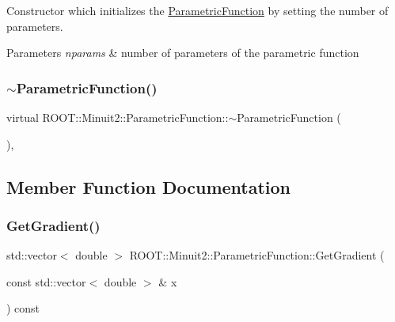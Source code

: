 Constructor which initializes the \mbox{\hyperlink{classROOT_1_1Minuit2_1_1ParametricFunction}{Parametric\+Function}} by setting the number of parameters.


\begin{DoxyParams}{Parameters}
{\em nparams} & number of parameters of the parametric function \\
\hline
\end{DoxyParams}
\mbox{\label{classROOT_1_1Minuit2_1_1ParametricFunction_a18aae731e634b4fc1c79403d8f49caa9}} 
\subsubsection{\texorpdfstring{$\sim$ParametricFunction()}{~ParametricFunction()}\hspace{0.1cm}{\footnotesize\ttfamily [3/3]}}
{\footnotesize\ttfamily virtual R\+O\+O\+T\+::\+Minuit2\+::\+Parametric\+Function\+::$\sim$\+Parametric\+Function (\begin{DoxyParamCaption}{ }\end{DoxyParamCaption})\hspace{0.3cm}{\ttfamily [inline]}, {\ttfamily [virtual]}}



\subsection{Member Function Documentation}
\mbox{\label{classROOT_1_1Minuit2_1_1ParametricFunction_abe6cfa5c64c578101da1d6fcecfb2249}} 
\subsubsection{\texorpdfstring{GetGradient()}{GetGradient()}\hspace{0.1cm}{\footnotesize\ttfamily [1/3]}}
{\footnotesize\ttfamily std\+::vector$<$ double $>$ R\+O\+O\+T\+::\+Minuit2\+::\+Parametric\+Function\+::\+Get\+Gradient (\begin{DoxyParamCaption}\item[{const std\+::vector$<$ double $>$ \&}]{x }\end{DoxyParamCaption}) const\hspace{0.3cm}{\ttfamily [virtual]}}

